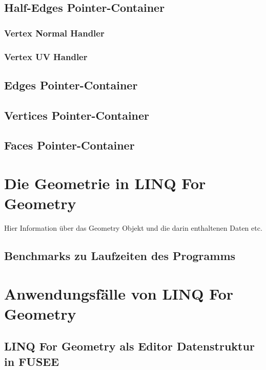 \documentclass[pagesize, paper=a4, fontsize=12pt,titlepage=true, headings=small, headnosepline, abstractoff, liststotoc, nochapterprefix, plainheadsepline]{scrreprt}
\newcommand{\LFGS}{LINQ For Geometry }
\begin{document}
		\subsection {Half-Edges Pointer-Container}

			\subsubsection {Vertex Normal Handler}
			
			\subsubsection {Vertex UV Handler}

		\subsection {Edges Pointer-Container}

		\subsection {Vertices Pointer-Container}

		\subsection {Faces Pointer-Container}

	\section {Die Geometrie in LINQ For Geometry}
			Hier Information über das Geometry Objekt und die darin enthaltenen Daten etc.
		\subsection {Benchmarks zu Laufzeiten des Programms}
	\section {Anwendungsfälle von LINQ For Geometry}
		\subsection {\LFGS als Editor Datenstruktur in FUSEE}
\end{document}
